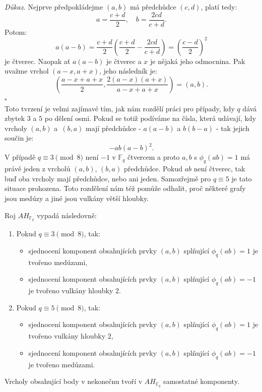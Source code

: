 \documentclass[12pt]{report}
\begin{document}
\noindent \textit{Důkaz.} Nejprve předpokládejme $(a,b)$ má předchůdce $(c,d)$, platí tedy:
\begin{equation*}
a = \frac{c+d}{2}, \quad b = \frac{2cd}{c+d}.
\end{equation*}
Potom:
\begin{equation*}
a(a-b) = \frac{c+d}{2} \left( \frac{c+d}{2} - \frac{2cd}{c+d} \right) =\left( \frac{c-d}{2}\right)^2
\end{equation*}
je čtverec. Naopak ať $a(a-b)$ je čtverec a $x$ je nějaká jeho odmocnina. Pak uvažme vrchol $(a-x,a+x)$, jeho následník je: $$\left(\frac{a-x+a+x}{2}, \frac{2 (a-x)(a+x)}{a-x+a+x} \right)= \left(a, b \right).$$ \hfill $\square$\\

Toto tvrzení je velmi zajímavé tím, jak nám rozdělí práci pro případy, kdy $q$ dává zbytek $3$ a $5$ po dělení osmi. Pokud se totiž podíváme na čísla, která udávají, kdy vrcholy $(a,b)$ a~$(b,a)$ mají předchůdce - $a(a-b)$ a $b(b-a)$ - tak jejich součin je:
$$-ab (a-b)^2.$$  
V případě $q \equiv 3 \pmod{8}$ není $-1$ v $\mathbb{F}_q$ čtvercem a proto $a,b$ s $\phi_q (ab) = 1$ má právě jeden z vrcholů $(a,b)$, $(b,a)$ předchůdce. Pokud $ab$ není čtverec, tak buď oba vrcholy mají předchůdce, nebo ani jeden. Samozřejmě pro $q \equiv 5$ je tato situace prohozena. Toto rozdělení nám též pomůže odhalit, proč některé grafy jsou medúzy a jiné jsou vulkány větší hloubky.
\begin{veta}\label{big}
Roj $AH_{\mathbb{F}_q}$ vypadá následovně:
\begin{enumerate}
\item Pokud $q \equiv 3 \pmod{8}$, tak:
\begin{itemize}
\item sjednocení komponent obsahujících prvky $(a,b)$ splňující $\phi_q(ab) = 1$ je tvořeno medúzami,
\item sjednocení komponent obsahujících prvky $(a,b)$ splňující $\phi_q(ab) = -1$ je tvořeno vulkány hloubky $2$.
\end{itemize}
\item Pokud $q \equiv 5 \pmod{8}$, tak:
\begin{itemize}
\item sjednocení komponent obsahujících prvky $(a,b)$ splňující $\phi_q(ab) = 1$ je tvořeno vulkány hloubky $2$,
\item sjednocení komponent obsahujících prvky $(a,b)$ splňující $\phi_q(ab) = -1$ je tvořeno medúzami.
\end{itemize}
\end{enumerate}
Vrcholy obsahující body v nekonečnu tvoří v $AH_{\mathbb{F}_q}$ samostatné komponenty.
\end{veta}
\end{document}
